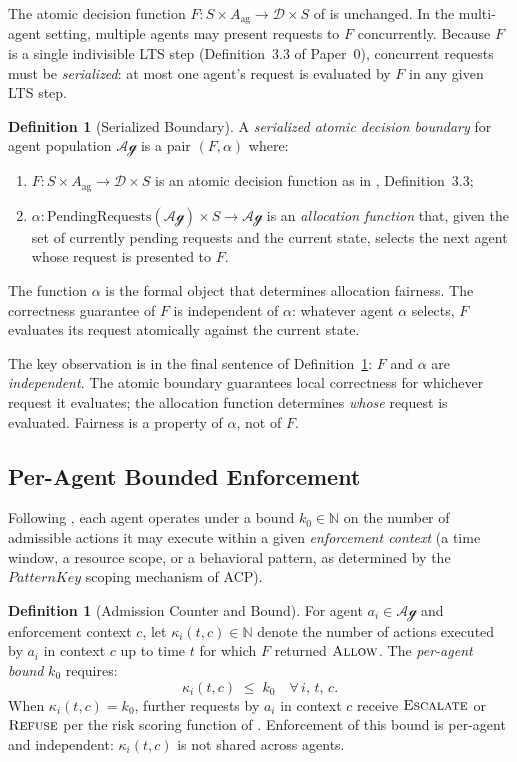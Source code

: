 \documentclass[11pt]{article}
\theoremstyle{plain}
\theoremstyle{definition}
\newtheorem{definition}[theorem]{Definition}
\theoremstyle{remark}
\newcommand{\Allow}{\textsc{Allow}}
\newcommand{\Refuse}{\textsc{Refuse}}
\newcommand{\Escalate}{\textsc{Escalate}}
\newcommand{\Dset}{\mathcal{D}}
\newcommand{\Agents}{\mathcal{Ag}}         %
\newcommand{\kbound}{k_0}                  %
\newcommand{\alloc}{\alpha}                %
\newcommand{\PatKey}{\mathit{PatternKey}}  %
\begin{document}
The atomic decision function $F : S \times A_{\mathrm{ag}} \to \Dset
\times S$ of \citet{fernandez2026a} is unchanged.  In the multi-agent
setting, multiple agents may present requests to $F$ concurrently.
Because $F$ is a single indivisible LTS step (Definition~3.3 of
Paper~0), concurrent requests must be \emph{serialized}: at most one
agent's request is evaluated by $F$ in any given LTS step.

\begin{definition}[Serialized Boundary]
\label{def:serial}
A \emph{serialized atomic decision boundary} for agent population
$\Agents$ is a pair $(F, \alloc)$ where:
\begin{enumerate}[label=(\roman*)]
  \item $F : S \times A_{\mathrm{ag}} \to \Dset \times S$ is an
    atomic decision function as in \citet{fernandez2026a},
    Definition~3.3;
  \item $\alloc : \mathrm{PendingRequests}(\Agents) \times S \to
    \Agents$ is an \emph{allocation function} that, given the set of
    currently pending requests and the current state, selects the
    next agent whose request is presented to $F$.
\end{enumerate}
The function $\alloc$ is the formal object that determines allocation
fairness.  The correctness guarantee of $F$ is independent of $\alloc$:
whatever agent $\alloc$ selects, $F$ evaluates its request atomically
against the current state.
\end{definition}

The key observation is in the final sentence of Definition~\ref{def:serial}:
$F$ and $\alloc$ are \emph{independent}.  The atomic boundary guarantees
local correctness for whichever request it evaluates; the allocation
function determines \emph{whose} request is evaluated.  Fairness is a
property of $\alloc$, not of $F$.

\subsection{Per-Agent Bounded Enforcement}
\label{sec:bounds}

Following \citet{fernandez2026b}, each agent operates under a bound
$\kbound \in \mathbb{N}$ on the number of admissible actions it may
execute within a given \emph{enforcement context} (a time window, a
resource scope, or a behavioral pattern, as determined by the
$\PatKey$ scoping mechanism of ACP).

\begin{definition}[Admission Counter and Bound]
\label{def:counter}
For agent $a_i \in \Agents$ and enforcement context $c$, let
$\kappa_i(t, c) \in \mathbb{N}$ denote the number of actions executed
by $a_i$ in context $c$ up to time $t$ for which $F$ returned
$\Allow$.  The \emph{per-agent bound} $\kbound$ requires:
\[
  \kappa_i(t, c) \;\leq\; \kbound \quad \forall\, i,\, t,\, c.
\]
When $\kappa_i(t,c) = \kbound$, further requests by $a_i$ in context $c$
receive $\Escalate$ or $\Refuse$ per the risk scoring function of
\citet{fernandez2026b}.  Enforcement of this bound is per-agent and
independent: $\kappa_i(t,c)$ is not shared across agents.
\end{definition}
\end{document}
